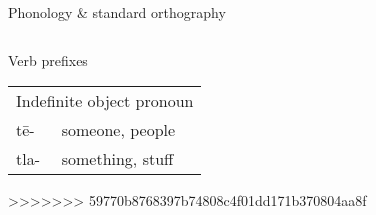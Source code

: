 \documentclass[12pt]{beamer}
\newcommand{\nah}[1]{\textcolor{nahgrn}{#1}}
\newcommand{\trs}[1]{\textcolor{nahblu}{#1}}
\begin{document}
\begin{frame}
\begin{columns}[t]
\begin{column}{.22\linewidth}
\begin{block}{Phonology \& standard orthography}
\begin{threeparttable}
\begin{tablenotes}
\begin{frame}
\begin{frame}
\begin{columns}[t]
\begin{column}{0.18\linewidth}
\begin{block}{Verb prefixes}
\begin{enumerate}
\begin{tabular}[t]{ll}
                  \multicolumn{2}{l}{Indefinite object pronoun} \\
                  \nah{tē-}  & \trs{someone, people}            \\
                  \nah{tla-} & \trs{something, stuff}           \\
                \end{tabular}
>>>>>>> 59770b8768397b74808c4f01dd171b370804aa8f
        \end{enumerate}
      \end{block}


\end{column}
\end{columns}
\end{frame}
\end{frame}
\end{tablenotes}
\end{threeparttable}
\end{block}
\end{column}
\end{columns}
\end{frame}
\end{document}
